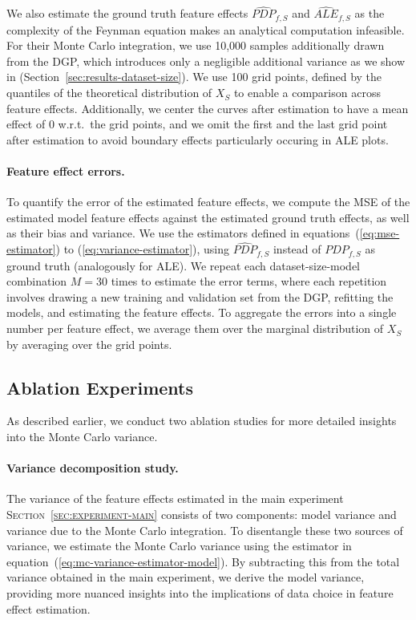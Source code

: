 \documentclass[runningheads]{llncs}
\begin{document}
We also estimate the ground truth feature effects $\widehat{PDP}_{f,S}$ and
$\widehat{ALE}_{f,S}$ as the complexity of the Feynman equation makes
an analytical computation infeasible. For their Monte Carlo integration, we use
10,000 samples additionally drawn from the DGP, which introduces only a
negligible additional variance as we show in (Section~\ref{sec:results-dataset-size}). We use 100 grid
points, defined by the quantiles of the theoretical distribution of $X_S$ to
enable a comparison across feature effects. Additionally, we center the curves
after estimation to have a mean effect of $0$ w.r.t.\ the grid points, and we
omit the first and the last grid point after estimation to avoid boundary
effects particularly occuring in ALE plots.

\paragraph{Feature effect errors.} To quantify the error of the estimated feature effects, we compute the MSE of
the estimated model feature effects against the estimated ground truth effects,
as well as their bias and variance. We use the
estimators defined in equations~(\ref{eq:mse-estimator}) to
(\ref{eq:variance-estimator}), using $\widehat{PDP}_{f,S}$ instead of
$PDP_{f,S}$ as ground truth (analogously for ALE). We repeat each
dataset-size-model combination $M=30$ times to estimate the error terms, where
each repetition involves drawing a new training and validation set from the
DGP, refitting the models, and estimating the feature effects. To aggregate the
errors into a single number per feature effect, we average them over the
marginal distribution of $X_S$ by averaging over the grid points.

\subsection{Ablation Experiments}\label{sec:experiment-ablation}

As described earlier, we conduct two ablation studies for more detailed
insights into the Monte Carlo variance.

\paragraph{Variance decomposition study.} The variance of the feature effects
estimated in the main experiment \textsc{Section~\ref{sec:experiment-main}} consists of two
components: model variance and variance due to the Monte Carlo
integration. To disentangle these two sources of variance, we estimate the
Monte Carlo variance using the estimator in
equation~(\ref{eq:mc-variance-estimator-model}). By subtracting this from the
total variance obtained in the main experiment, we derive the model variance,
providing more nuanced insights into the implications of data choice in feature
effect estimation. 
\end{document}
